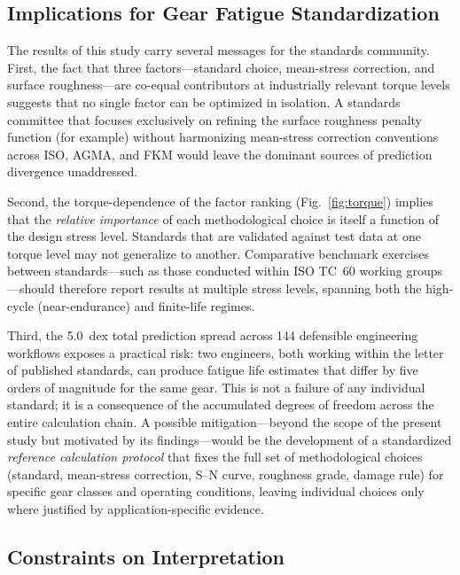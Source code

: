 \documentclass[12pt,a4paper]{article}
\begin{document}
\subsection{Implications for Gear Fatigue Standardization}

The results of this study carry several messages for the standards
community. First, the fact that three factors---standard choice,
mean-stress correction, and surface roughness---are co-equal
contributors at industrially relevant torque levels suggests that
no single factor can be optimized in isolation. A standards committee
that focuses exclusively on refining the surface roughness penalty
function (for example) without harmonizing mean-stress correction
conventions across ISO, AGMA, and FKM would leave the dominant
sources of prediction divergence unaddressed.

Second, the torque-dependence of the factor ranking
(Fig.~\ref{fig:torque}) implies that the \emph{relative importance} of
each methodological choice is itself a function of the design stress
level. Standards that are validated against test data at one torque
level may not generalize to another. Comparative benchmark exercises
between standards---such as those conducted within ISO TC~60 working
groups---should therefore report results at multiple stress levels,
spanning both the high-cycle (near-endurance) and finite-life regimes.

Third, the 5.0~dex total prediction spread across 144 defensible
engineering workflows exposes a practical risk: two engineers, both
working within the letter of published standards, can produce fatigue
life estimates that differ by five orders of magnitude for the same
gear. This is not a failure of any individual standard; it is a
consequence of the accumulated degrees of freedom across the entire
calculation chain. A possible mitigation---beyond the scope of the
present study but motivated by its findings---would be the development
of a standardized \emph{reference calculation protocol} that fixes the
full set of methodological choices (standard, mean-stress correction,
S--N curve, roughness grade, damage rule) for specific gear classes and
operating conditions, leaving individual choices only where justified
by application-specific evidence.

\subsection{Constraints on Interpretation}
\label{sec:constraints}
\end{document}

